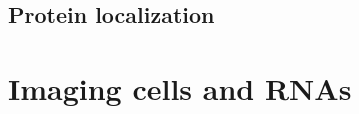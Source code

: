 


\subsection{Protein localization}
\label{subsec:intro_protein_loc}


\section{Imaging cells and RNAs}
\label{sec:fish}

